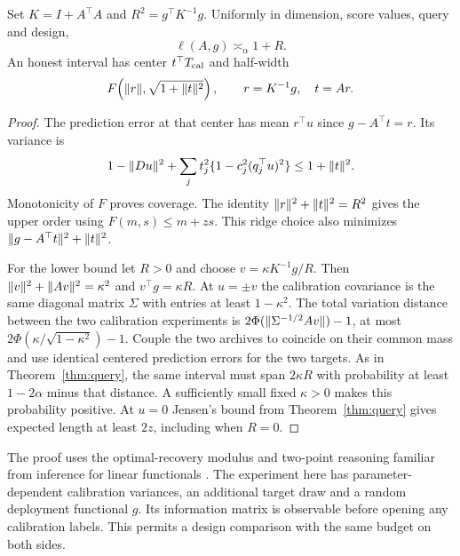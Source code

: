\begin{theorem}\label{thm:archive}
Set $K=I+A^\top A$ and $R^2=g^\top K^{-1}g$. Uniformly in dimension, score values, query and design,
\[
 \ell(A,g)\asymp_\alpha 1+R.
\]
An honest interval has center $t^\top T_{\rm cal}$ and half-width
\begin{equation}
 F\!\left(\lVert r\rVert,\sqrt{1+\lVert t\rVert^2}\right),\qquad r=K^{-1}g,\quad t=Ar.
 \label{eq:ridge}
\end{equation}
\end{theorem}
\begin{proof}
The prediction error at that center has mean $r^\top u$ since $g-A^\top t=r$. Its variance is
\[
 1-\lVert Du\rVert^2+\sum_j t_j^2\{1-c_j^2(q_j^\top u)^2\}\le 1+\lVert t\rVert^2 .
\]
Monotonicity of $F$ proves coverage. The identity $\lVert r\rVert^2+\lVert t\rVert^2=R^2$ gives the upper order using $F(m,s)\le m+zs$. This ridge choice also minimizes $\lVert g-A^\top t\rVert^2+\lVert t\rVert^2$.

For the lower bound let $R>0$ and choose $v=\kappa K^{-1}g/R$. Then $\lVert v\rVert^2+\lVert Av\rVert^2=\kappa^2$ and $v^\top g=\kappa R$. At $u=\pm v$ the calibration covariance is the same diagonal matrix $\Sigma$ with entries at least $1-\kappa^2$. The total variation distance between the two calibration experiments is $2\Phi(\lVert \Sigma^{-1/2}Av\rVert)-1$, at most $2\Phi(\kappa/\sqrt{1-\kappa^2})-1$. Couple the two archives to coincide on their common mass and use identical centered prediction errors for the two targets. As in Theorem~\ref{thm:query}, the same interval must span $2\kappa R$ with probability at least $1-2\alpha$ minus that distance. A sufficiently small fixed $\kappa>0$ makes this probability positive. At $u=0$ Jensen's bound from Theorem~\ref{thm:query} gives expected length at least $2z$, including when $R=0$.
\end{proof}
The proof uses the optimal-recovery modulus and two-point reasoning familiar from inference for linear functionals \cite{donoho}. The experiment here has parameter-dependent calibration variances, an additional target draw and a random deployment functional $g$. Its information matrix is observable before opening any calibration labels. This permits a design comparison with the same budget on both sides.

